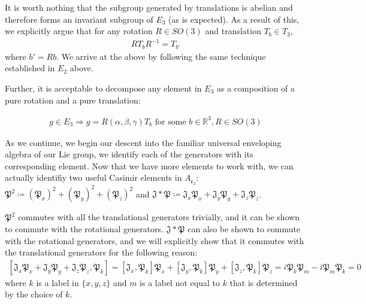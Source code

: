 \documentclass[10pt]{ucthesis}
\newcommand{\R}{\mathbb{R}}
\begin{document}
It is worth nothing that the subgroup generated by translations is abelian and therefore forms an invariant subgroup of $E_3$ (as is expected). As a result of this, we explicitly argue that for any rotation $R\in SO(3)$ and translation $T_b\in T_3$,
\begin{equation}
\begin{aligned}
	RT_bR^{-1} = T_{b'}
\end{aligned}
\end{equation}
where $b' = Rb$. We arrive at the above by following the same technique established in $E_2$ above.

Further, it is acceptable to decompose any element in $E_3$ as a composition of a pure rotation and a pure translation:

\begin{equation}
\begin{aligned}
	g\in E_3 \Rightarrow g = R(\alpha,\beta,\gamma)T_b\text{ for some } b\in\R^3, R\in SO(3)
\end{aligned}
\end{equation}

As we continue, we begin our descent into the familiar universal enveloping algebra of our Lie group, we identify each of the generators with its corresponding element. Now that we have more elements to work with, we can actually identifiy two useful Casimir elements in $A_\mathfrak{e_2}$: $\mathfrak{P^2}\coloneq (\mathfrak{P}_x)^2 + (\mathfrak{P}_y)^2 + (\mathfrak{P}_z)^2$ and $\mathfrak{J}* \mathfrak{P} \coloneq \mathfrak{J}_x\mathfrak{P}_x +\mathfrak{J}_y\mathfrak{P}_y + \mathfrak{J}_z\mathfrak{P}_z$.

$\mathfrak{P^2}$ commutes with all the translational generators trivially, and it can be shown to commute with the rotational generators.
$\mathfrak{J}*\mathfrak{P}$ can also be shown to commute with the rotational generators, and we will explicitly show that it commutes with the translational generators for the following reason:
\begin{equation}
\begin{aligned}
 [\mathfrak{J}_x\mathfrak{P}_x+\mathfrak{J}_y\mathfrak{P}_y+\mathfrak{J}_z\mathfrak{P}_z, \mathfrak{P}_k] = [\mathfrak{J}_x,\mathfrak{P}_k]\mathfrak{P}_x + [\mathfrak{J}_y,\mathfrak{P}_k]\mathfrak{P}_y + [\mathfrak{J}_z,\mathfrak{P}_k]\mathfrak{P}_z = i\mathfrak{P}_k\mathfrak{P}_m-i\mathfrak{P}_m\mathfrak{P}_k = 0
\end{aligned}
\end{equation}
where $k$ is a label in $\{x,y,z\}$ and $m$ is a label not equal to $k$ that is determined by the choice of $k$.
\end{document}
